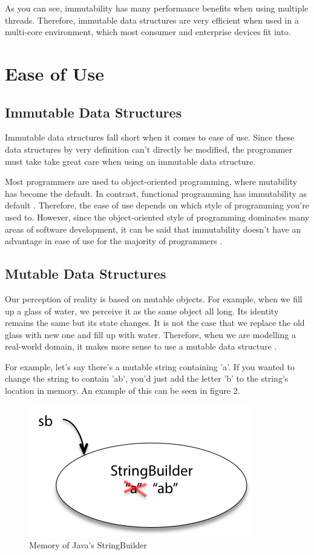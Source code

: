 \documentclass[11pt]{article}
\begin{document}
As you can see, immutability has many performance benefits when using multiple
threads. Therefore, immutable data structures are very efficient when used in a
multi-core environment, which most consumer and enterprise devices fit into.
\clearpage

\section{Ease of Use}
\subsection{Immutable Data Structures}
Immutable data structures fall short when it comes to ease of use. Since these
data structures by very definition can't directly be modified, the programmer
must take take great care when using an immutable data structure.

Most programmers are used to object-oriented programming, where mutability has
become the default. In contrast, functional programming has immutability as
default \cite{miles}. Therefore, the ease of use depends on which style of
programming you're used to. However, since the object-oriented style of
programming dominates many areas of software development, it can be said that
immutability doesn't have an advantage in ease of use for the majority of
programmers \cite{ieee_spectrum}.

\subsection{Mutable Data Structures}
Our perception of reality is based on mutable objects. For example, when we
fill up a glass of water, we perceive it as the same object all long. Its
identity remains the same but its state changes. It is not the case that we
replace the old glass with new one and fill up with water. Therefore, when we
are modelling a real-world domain, it makes more sense to use a mutable data
structure \cite{peter_toro}.

For example, let's say there's a mutable string containing 'a'. If you wanted
to change the string to contain 'ab', you'd just add the letter 'b' to the
string's location in memory. An example of this can be seen in figure 2.

\begin{figure}[H]
\centering

\includegraphics{string_builder}
\caption{Memory of Java's StringBuilder \cite{mit_reading_9}}

\end{figure}
\clearpage
\end{document}

